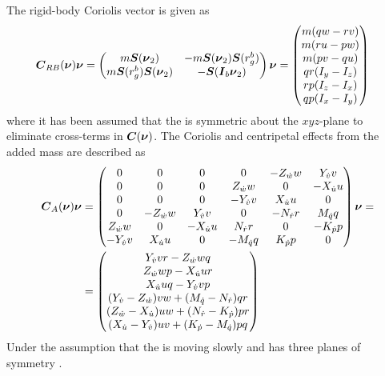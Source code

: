 The rigid-body Coriolis vector is given as
\begin{equation}
\begin{split}
    \boldsymbol{C}_{RB}(\boldsymbol{\nu})\boldsymbol{\nu} &= 
    \begin{pmatrix}
        m\boldsymbol{S}(\boldsymbol{\nu}_2)              & -m\boldsymbol{S}(\boldsymbol{\nu}_2)\boldsymbol{S}(r_g^b)  \\
        m\boldsymbol{S}(r_g^b)\boldsymbol{S}(\boldsymbol{\nu}_2) & -\boldsymbol{S}(\boldsymbol{I}_{b}\boldsymbol{\nu}_2) \\
    \end{pmatrix}
    \boldsymbol{\nu} = 
    \begin{pmatrix}
    m (q w-r v) \\
    m (r u-p w) \\
    m (p v-q u) \\
    q r(I_{y}-I_{z}) \\
    r p(I_{z}-I_{x}) \\
    q p(I_{x}-I_{y}) \\
    \end{pmatrix}
\end{split}
\end{equation}
where it has been assumed that the \abbrROV is symmetric about the $xyz$-plane to eliminate cross-terms in $\boldsymbol{C}(\boldsymbol{\nu})$\citep[p.55]{fossen2011}.
The Coriolis and centripetal effects from the added mass are described as
\begin{equation}
\begin{split}
    \boldsymbol{C}_A(\boldsymbol{\nu}) \boldsymbol{\nu} &= 
    \begin{pmatrix}
    0 & 0 & 0 & 0 & -Z_{\dot{w}} w & Y_{\dot{v}} v \\
    0 & 0 & 0 & Z_{\dot{w}} w & 0 & -X_{\dot{u}} u \\
    0 & 0 & 0 & -Y_{\dot{v}} v & X_{\dot{u}} u & 0 \\
    0 & -Z_{\dot{w}} w & Y_{\dot{v}} v & 0 & -N_{\dot{r}} r & M_{\dot{q}} q \\
    Z_{\dot{w}} w & 0 & -X_{\dot{u}} u & N_{\dot{r}} r & 0 & -K_{\dot{p}} p \\
    -Y_{\dot{v}} v & X_{\dot{u}} u & 0 & - M_{\dot{q}} q & K_{\dot{p}} p & 0 \\
    \end{pmatrix}
    \boldsymbol{\nu} = \\ 
    &= \begin{pmatrix}
        Y_{\dot{v}} v r - Z_{\dot{w}} w q\\
        Z_{\dot{w}} w p - X_{\dot{u}} u r\\
        X_{\dot{u}} u q - Y_{\dot{v}} v p \\
        (Y_{\dot{v}} - Z_{\dot{w}}) v w + (M_{\dot{q}} - N_{\dot{r}}) q r\\
        (Z_{\dot{w}} - X_{\dot{u}}) u w + (N_{\dot{r}} - K_{\dot{p}}) p r\\
        (X_{\dot{u}} - Y_{\dot{v}}) u v + (K_{\dot{p}} - M_{\dot{q}}) p q \\
    \end{pmatrix}
\end{split}
\end{equation} Under the assumption that the \abbrROV is moving slowly and has three planes of symmetry \citep[p.121]{fossen2011}. 
